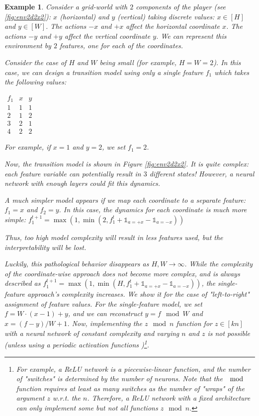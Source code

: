 \documentclass[a4paper,11pt,oneside]{report}
\newtheorem{example}{Example}[section]
\begin{document}
\begin{example}
    Consider a grid-world with $2$ components of the player (see \autoref{fig:env2d2x2}): $x$ (horizontal) and $y$ (vertical) taking discrete values: $x\in [H]$ and $y\in [W]$. The actions $-x$ and $+x$ affect the horizontal coordinate $x$. The actions $-y$ and $+y$ affect the vertical coordinate $y$. We can represent this environment by $2$ features, one for each of the coordinates.

    Consider the case of $H$ and $W$ being small (for example, $H=W=2$). In this case, we can design a transition model using only a single feature $f_1$ which takes the following values:

\begin{center}
    $
    \begin{array}{c|cc}
        f_1 & x & y \\\hline
        1 & 1 & 1 \\
        2 & 1 & 2 \\
        3 & 2 & 1 \\
        4 & 2 & 2
    \end{array}
    $
\end{center}

    For example, if $x=1$ and $y=2$, we set $f_1=2$.

    Now, the transition model is shown in Figure \ref{fig:env2d2x2}. It is quite complex: each feature variable can potentially result in $3$ different states! However, a neural network with enough layers could fit this dynamics.

    A much simpler model appears if we map each coordinate to a separate feature: $f_1=x$ and $f_2=y$. In this case, the dynamics for each coordinate is much more simple:
    $f_1^{t+1}=\max(1, \min(2, f_1^t+\mathds 1_{a=+x}-\mathds 1_{a=-x}))$

    Thus, too high model complexity will result in less features used, but the interpretability will be lost.

    Luckily, this pathological behavior disappears as $H, W\to\infty$. While the complexity of the coordinate-wise approach does {\em not} become more complex, and is always described as $f_1^{t+1}=\max(1, \min(H, f_1^t+\mathds 1_{a=+x}-\mathds 1_{a=-x}))$, the single-feature approach's complexity increases. We show it for the case of "left-to-right" assignment of feature values.
    For the single-feature model, we set $f=W\cdot (x - 1)+y$, and we can reconstruct $y=f\mod W$ and $x=(f-y)/W+1$.
    Now, implementing the $z\mod n$ function for $z\in [kn]$ with a neural network of constant complexity and varying $n$ and $z$ is not possible (unless using a periodic activation functions \cite{Sitzmann2020})\footnote{For example, a ReLU network is a piecewise-linear function, and the number of "switches" is determined by the number of neurons. Note that the $\mod$ function requires at least as many switches as the number of "wraps" of the argument $z$ w.r.t. the $n$. Therefore, a ReLU network with a fixed architecture can only implement some but not all functions $z\mod n$.}.


\end{example}
\end{document}
